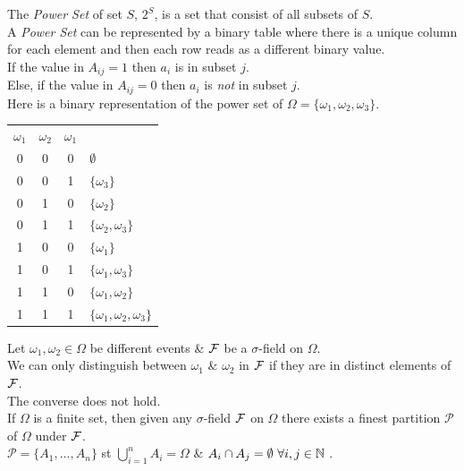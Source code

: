 \documentclass[11pt,a4paper]{article}
\begin{document}
The \textit{Power Set} of set $S$, $2^S$, is a set that consist of all subsets of $S$.\\

A \textit{Power Set} can be represented by a binary table where there is a unique column for each element and then each row reads as a different binary value.\\
If the value in $A_{ij}=1$ then $a_i$ is in subset $j$.\\
Else, if the value in $A_{ij}=0$ then $a_i$ is \textit{not} in subset $j$.\\

Here is a binary representation of the power set of $\Omega=\{\omega_1,\omega_2,\omega_3\}$.\\
\begin{tabular}{c|c|cl}
$\omega_1$&$\omega_2$&$\omega_1$\\
\cline{1-3}
0&0&0&$\emptyset$\\
0&0&1&$\{\omega_3\}$\\
0&1&0&$\{\omega_2\}$\\
0&1&1&$\{\omega_2,\omega_3\}$\\
1&0&0&$\{\omega_1\}$\\
1&0&1&$\{\omega_1,\omega_3\}$\\
1&1&0&$\{\omega_1,\omega_2\}$\\
1&1&1&$\{\omega_1,\omega_2,\omega_3\}$\\
\end{tabular}

Let $\omega_1,\omega_2 \in\Omega$ be different events \& $\mathcal{F}$ be a $\sigma$-field on $\Omega$.\\
We can only distinguish between $\omega_1$ \& $\omega_2$ in $\mathcal{F}$ if they are in distinct elements of $\mathcal{F}$.\\
\nb The converse does not hold.\\

If $\Omega$ is a finite set, then given any $\sigma$-field $\mathcal{F}$ on $\Omega$ there exists a finest partition $\mathcal{P}$ of $\Omega$ under $\mathcal{F}$.\\
\nb $\mathcal{P}=\{A_1,\dots,A_n\}$ st $\bigcup_{i=1}^n A_i=\Omega$ \& $A_i\cap A_j=\emptyset\ \forall i,j\in\mathbb{N}$ .
\end{document}
